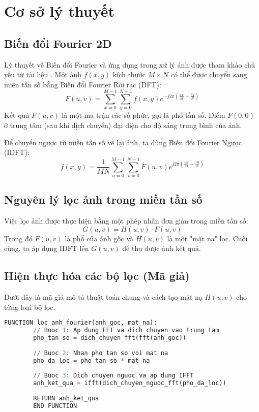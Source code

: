 \documentclass[12pt, a4paper]{article}
\begin{document}
	\section{Cơ sở lý thuyết}
	\subsection{Biến đổi Fourier 2D}
	Lý thuyết về Biến đổi Fourier và ứng dụng trong xử lý ảnh được tham khảo chủ yếu từ tài liệu \cite{gonzalez2018digital}. Một ảnh $f(x, y)$ kích thước $M \times N$ có thể được chuyển sang miền tần số bằng Biến đổi Fourier Rời rạc (DFT):
	\begin{equation}
		F(u, v) = \sum_{x=0}^{M-1} \sum_{y=0}^{N-1} f(x, y) e^{-j2\pi(\frac{ux}{M} + \frac{vy}{N})}
	\end{equation}
	Kết quả $F(u, v)$ là một ma trận các số phức, gọi là phổ tần số. Điểm $F(0,0)$ ở trung tâm (sau khi dịch chuyển) đại diện cho độ sáng trung bình của ảnh.
	
	Để chuyển ngược từ miền tần số về lại ảnh, ta dùng Biến đổi Fourier Ngược (IDFT):
	\begin{equation}
		f(x, y) = \frac{1}{MN} \sum_{u=0}^{M-1} \sum_{v=0}^{N-1} F(u, v) e^{j2\pi(\frac{ux}{M} + \frac{vy}{N})}
	\end{equation}
	
	\subsection{Nguyên lý lọc ảnh trong miền tần số}
	Việc lọc ảnh được thực hiện bằng một phép nhân đơn giản trong miền tần số:
	\begin{equation}
		G(u, v) = H(u, v) \cdot F(u, v)
	\end{equation}
	Trong đó $F(u, v)$ là phổ của ảnh gốc và $H(u, v)$ là một "mặt nạ" lọc. Cuối cùng, ta áp dụng IDFT lên $G(u, v)$ để thu được ảnh kết quả.
	
	\subsection{Hiện thực hóa các bộ lọc (Mã giả)}
	Dưới đây là mã giả mô tả thuật toán chung và cách tạo mặt nạ $H(u,v)$ cho từng loại bộ lọc.
	
	\begin{lstlisting}[language=Python, caption={Thuật toán lọc Fourier tổng quát.}, label={lst:general_fourier}]
		FUNCTION loc_anh_fourier(anh_goc, mat_na):
		// Buoc 1: Ap dung FFT va dich chuyen vao trung tam
		pho_tan_so = dich_chuyen_fft(fft(anh_goc))
		
		// Buoc 2: Nhan pho tan so voi mat na
		pho_da_loc = pho_tan_so * mat_na
		
		// Buoc 3: Dich chuyen nguoc va ap dung IFFT
		anh_ket_qua = ifft(dich_chuyen_nguoc_fft(pho_da_loc))
		
		RETURN anh_ket_qua
		END FUNCTION
	\end{lstlisting}
	
\end{document}

